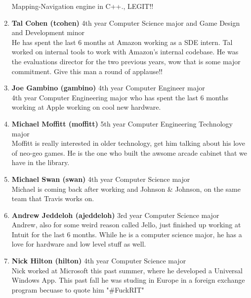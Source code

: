 \documentclass[9pt]{extarticle}
\begin{document}
\begin{enumerate}
	Mapping-Navigation engine in C++., LEGIT!!
\\
\item \textbf{Tal Cohen (tcohen)} 4th year Computer Science major and Game Design and Development minor \\
	He has spent the last 6 months at Amazon working as a SDE intern. Tal worked
	on internal tools to work with Amazon's internal codebase. He was the 
	evaluations director for the two previous years, wow that is some major 
	commitment. Give this man a round of applause!!
\\
\item \textbf{Joe Gambino (gambino)} 4th year Computer Engineer major \\
	4th year Computer Engineering major who	has spent the last 6 months
	working at Apple working on cool new hardware.
\\
\item \textbf{Michael Moffitt (moffitt)} 5th year Computer Engineering Technology major \\
    Moffitt is really interested in older technology, get him talking about 
    his love of neo-geo games. He is the one who built the awsome arcade 
    cabinet that we have in the library.
\\
\item \textbf{Michael Swan (swan)} 4th year Computer Science major \\
    Michael is coming back after working and Johnson \& Johnson, on the same
    team that Travis works on.
\\
\item \textbf{Andrew Jeddeloh (ajeddeloh)} 3rd year Computer Science major \\
    Andrew, also for some weird reason called Jello, just finished up working
    at Intuit for the last 6 months. While he is a computer science major,
    he has a love for hardware and low level stuff as well.
\\
\item \textbf{Nick Hilton (hilton)} 4th year Computer Science major \\
    Nick worked at Microsoft this past summer, where he developed a Universal
    Windows App. This past fall he was studing in Europe in a foreign exchange 
    program becuase to quote him "\#FuckRIT"
\\
\end{enumerate}
\end{document}
